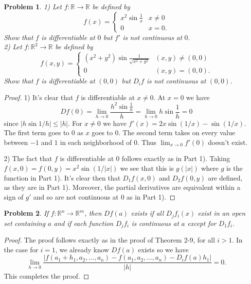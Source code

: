\documentclass{article}
\newtheorem{problem}{Problem}
\begin{document}
\begin{flushleft}
\begin{problem}
1) Let $f : \mathbb{R} \rightarrow \mathbb{R}$ be defined by
\[
f(x) =
\begin{cases}
x^2 \sin \frac{1}{x} & x \neq 0\\
0 & x = 0.
\end{cases}
\]
Show that $f$ is differentiable at $0$ but $f'$ is not continuous at $0$.\\
2) Let $f : \mathbb{R}^2 \rightarrow \mathbb{R}$ be defined by
\[
f(x,y) =
\begin{cases}
(x^2 + y^2) \sin \frac{1}{\sqrt{x^2 + y^2}} & (x,y) \neq (0,0)\\
0 & (x,y) = (0,0).
\end{cases}
\]
Show that $f$ is differentiable at $(0,0)$ but $D_i f$ is not continuous at $(0,0)$.
\end{problem}
\begin{proof}
1) It's clear that $f$ is differentiable at $x \neq 0$. At $x = 0$ we have
\[
Df(0) = \lim_{h \rightarrow 0} \frac{h^2 \sin \frac{1}{h}}{h} = \lim_{h \rightarrow 0} h \sin \frac{1}{h} = 0
\]
since $|h \sin 1/h| \leq |h|$. For $x \neq 0$ we have $f'(x) = 2x\sin(1/x) - \sin(1/x)$. The first term goes to $0$ as $x$ goes to $0$. The second term takes on every value between $-1$ and $1$ in each neighborhood of $0$. Thus $\lim_{x \rightarrow 0} f'(0)$ doesn't exist.\newline

2) The fact that $f$ is differentiable at $0$ follows exactly as in Part 1). Taking $f(x,0) = f(0,y) = x^2 \sin (1/|x|)$ we see that this is $g(|x|)$ where $g$ is the function in Part 1). It's clear then that $D_1f(x,0)$ and $D_2f(0,y)$ are defined, as they are in Part 1). Moreover, the partial derivatives are equivalent within a sign of $g'$ and so are not continuous at $0$ as in Part 1).
\end{proof}

\begin{problem}
If $f : \mathbb{R}^n \rightarrow \mathbb{R}^m$, then $Df(a)$ exists if all $D_jf_i(x)$ exist in an open set containing $a$ and if each function $D_jf_i$ is continuous at $a$ except for $D_1f_i$.
\end{problem}
\begin{proof}
The proof follows exactly as in the proof of Theorem 2-9, for all $i > 1$. In the case for $i=1$, we already know $Df(a)$ exists so we have
\[
\lim_{h \rightarrow 0} \frac{|f(a_1 + h_1, a_2, \dots , a_n)  - f(a_1, a_2, \dots , a_n) - D_if(a)h_1|}{|h|} = 0.
\]
This completes the proof.
\end{proof}


\end{flushleft}
\end{document}
